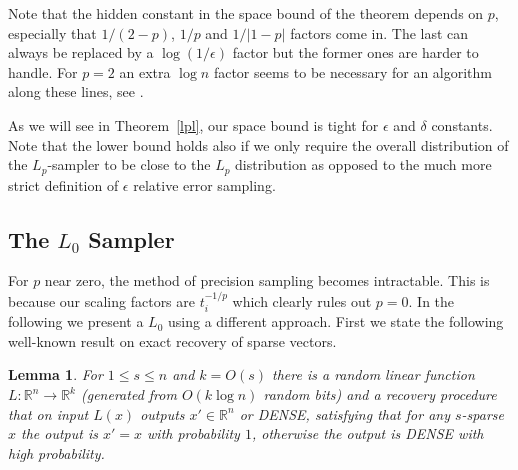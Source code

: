 \documentclass[9pt,letterpaper]{article}
\newtheorem{lemma}{Lemma}
\theoremstyle{remark}
\begin{document}
Note that the hidden constant in the space bound of the theorem depends on
$p$, especially that $1/(2-p)$, $1/p$ and $1/|1-p|$ factors come in. The last
can
always be replaced by a $\log(1/\epsilon)$ factor but the former ones are
harder to handle. For $p=2$ an extra $\log n$ factor seems to be necessary for
an algorithm along these lines, see \cite{AndoniKO10}.

As we will see in Theorem~\ref{lpl}, our space bound is tight for $\epsilon$
and $\delta$ constants. Note that the lower bound holds also if we only
require the overall distribution of the $L_p$-sampler to be close to the $L_p$
distribution as opposed to the much more strict definition of $\epsilon$
relative error sampling.

%
%
\subsection{The $L_0$ Sampler}
  For $p$ near zero, the method of precision sampling
   becomes intractable. This is because our scaling factors are
   $t_i^{-1/p}$ which clearly rules out $p=0$.
   In the following we present a $L_0$ using a different approach.
First we state the following well-known result on exact recovery of sparse vectors.
\begin{lemma}\label{lem:sparse}
For $1\le s\le n$ and $k=O(s)$ there is a random linear function
$L:\mathbb R^n\to\mathbb R^k$ (generated from $O(k\log n)$ random bits) and a
recovery procedure that on input $L(x)$ outputs $x'\in\mathbb R^n$ or DENSE,
satisfying that for any $s$-sparse $x$ the output is $x'=x$ with
probability $1$, otherwise the output is DENSE with
high probability.
\end{lemma}
\end{document}
